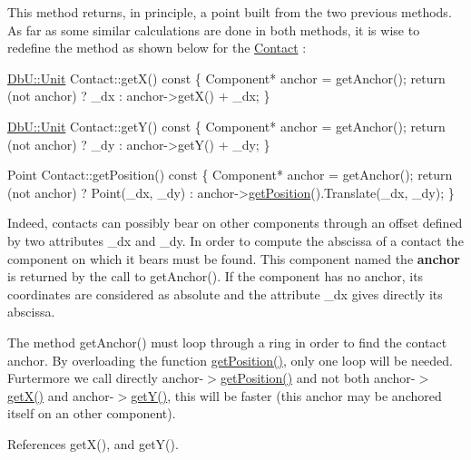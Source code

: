 This method returns, in principle, a point built from the two previous methods. As far as some similar calculations are done in both methods, it is wise to redefine the method as shown below for the \mbox{\hyperlink{classHurricane_1_1Contact}{Contact}} \+: 
\begin{DoxyCode}
\mbox{\hyperlink{group__DbUGroup_ga4fbfa3e8c89347af76c9628ea06c4146}{DbU::Unit}} Contact::getX()\textcolor{keyword}{ const}
\textcolor{keyword}{}\{
  Component* anchor = getAnchor();
  \textcolor{keywordflow}{return} (not anchor) ? \_dx : anchor->getX() + \_dx;
\}
 

\mbox{\hyperlink{group__DbUGroup_ga4fbfa3e8c89347af76c9628ea06c4146}{DbU::Unit}} Contact::getY()\textcolor{keyword}{ const}
\textcolor{keyword}{}\{
  Component* anchor = getAnchor();
  \textcolor{keywordflow}{return} (not anchor) ? \_dy : anchor->getY() + \_dy;
\}
 

Point Contact::getPosition()\textcolor{keyword}{ const}
\textcolor{keyword}{}\{
  Component* anchor = getAnchor();
  \textcolor{keywordflow}{return} (not anchor) ? Point(\_dx, \_dy)
                      : anchor->\mbox{\hyperlink{classHurricane_1_1Component_aa4e9a47c89fe701670ca34355195d519}{getPosition}}().Translate(\_dx, \_dy);
\}
\end{DoxyCode}


Indeed, contacts can possibly bear on other components through an offset defined by two attributes \+\_\+dx and \+\_\+dy. In order to compute the abscissa of a contact the component on which it bears must be found. This component named the {\bfseries anchor} is returned by the call to get\+Anchor(). If the component has no anchor, its coordinates are considered as absolute and the attribute \+\_\+dx gives directly its abscissa.

The method get\+Anchor() must loop through a ring in order to find the contact anchor. By overloading the function \mbox{\hyperlink{classHurricane_1_1Component_aa4e9a47c89fe701670ca34355195d519}{get\+Position()}}, only one loop will be needed. Furtermore we call directly anchor-\/$>$\mbox{\hyperlink{classHurricane_1_1Component_aa4e9a47c89fe701670ca34355195d519}{get\+Position()}} and not both anchor-\/$>$\mbox{\hyperlink{classHurricane_1_1Component_a0f8299ed73705fd4fbf56589dcc7e074}{get\+X()}} and anchor-\/$>$\mbox{\hyperlink{classHurricane_1_1Component_a727da3f127c3a7a0a09468219f98c3e6}{get\+Y()}}, this will be faster (this anchor may be anchored itself on an other component). 

References get\+X(), and get\+Y().

